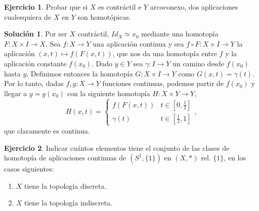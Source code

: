\documentclass{article}
\theoremstyle{plain}
\theoremstyle{definition}
\newtheorem{exercise}{Ejercicio}
\newtheorem*{sol*}{Solución}
\begin{document}
\newpage
\begin{exercise}
Probar que si $X$ es contráctil e $Y$ arcoconexo, dos aplicaciones cualesquiera de $X$ en $Y$ son homotópicas.
\end{exercise}
\begin{sol*}
Por ser $X$ contráctil, $Id_X\simeq x_0$ mediante una homotopía $F:X\times I\to X$. Sea $f:X\to Y$ una aplicación continua y sea $f\circ F: X\times I\to Y$ la aplicación $(x,t)\mapsto f(F(x,t))$, que nos da una homotopía entre $f$ y la aplicación constante $f(x_0)$. Dado $y\in Y$ sea $\gamma: I\to Y$ un camino desde $f(x_0)$ hasta $y$. Definimos entonces la homotopía $G:X\times I\to Y$ como $G(x,t)=\gamma(t)$. Por lo tanto, dadas $f,g:X\to Y$ funciones continuas, podemos partir de $f(x_0)$ y llegar a $y=g(x_0)$ con la siguiente homotopía $H:X\times Y\to Y$,
$$
H(x,t)=\begin{cases}
f(F(x,t)) & t\in[0,\frac{1}{2}]\\
\gamma(t) & t\in[\frac{1}{2},1]
\end{cases},
$$
que claramente es continua.
\end{sol*}
\newpage
\begin{exercise}
Indicar cuántos elementos tiene el conjunto de las clases de homotopía de aplicaciones continuas de $(S^1,\{1\})$ en $(X,*)$ rel. $\{1\}$, en los casos siguientes:
\begin{enumerate}
\item $X$ tiene la topología discreta.
\item $X$ tiene la topología indiscreta.
\end{enumerate}

\end{exercise}
\end{document}
